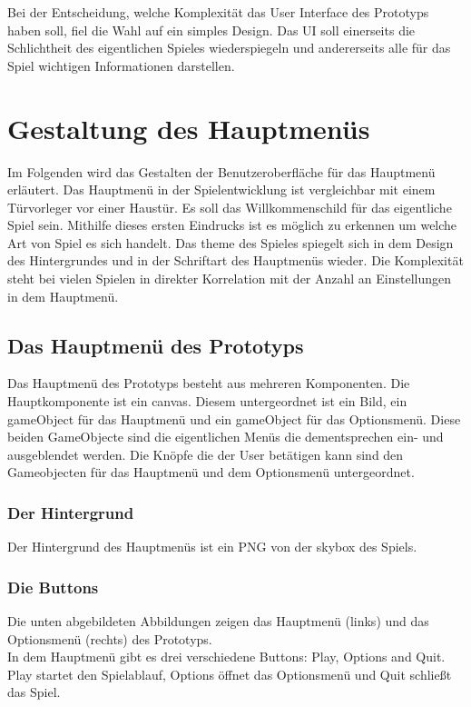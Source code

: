 \noindent
Bei der Entscheidung, welche Komplexität das User Interface des Prototyps haben soll, fiel die Wahl auf ein simples Design. 
Das \gls{UI} soll einerseits die Schlichtheit des eigentlichen Spieles wiederspiegeln und andererseits alle für das Spiel wichtigen Informationen darstellen.

\section{Gestaltung des Hauptmenüs}

Im Folgenden wird das Gestalten der Benutzeroberfläche für das Hauptmenü erläutert. 
Das Hauptmenü in der Spielentwicklung ist vergleichbar mit einem Türvorleger vor einer Haustür. Es soll das Willkommenschild für das eigentliche Spiel sein. 
Mithilfe dieses ersten Eindrucks ist es möglich zu erkennen um welche Art von Spiel es sich handelt. Das \gls{theme} des Spieles spiegelt sich in dem Design des Hintergrundes und in der Schriftart des Hauptmenüs wieder. Die Komplexität steht bei vielen Spielen in direkter Korrelation mit der Anzahl an Einstellungen in dem Hauptmenü.

\pagebreak

\subsection{Das Hauptmenü des Prototyps}

Das Hauptmenü des Prototyps besteht aus mehreren Komponenten. Die Hauptkomponente ist ein \gls{canvas}. Diesem untergeordnet ist ein Bild, ein \gls{gameObject} für das Hauptmenü und ein \gls{gameObject} für das Optionsmenü. Diese beiden GameObjecte sind die eigentlichen Menüs die dementsprechen ein- und ausgeblendet werden. Die Knöpfe die der User betätigen kann sind den Gameobjecten für das Hauptmenü und dem Optionsmenü untergeordnet. 
\subsubsection{Der Hintergrund}
Der Hintergrund des Hauptmenüs ist ein PNG von der \gls{skybox} des Spiels. 

\subsubsection{Die Buttons}
Die unten abgebildeten Abbildungen zeigen das Hauptmenü (links) und das Optionsmenü (rechts) des Prototyps. \\
In dem Hauptmenü gibt es drei verschiedene Buttons: Play, Options and Quit.\\
Play startet den Spielablauf, Options öffnet das Optionsmenü und Quit schließt das Spiel.\\\\

